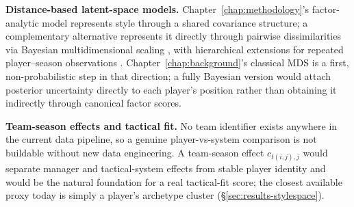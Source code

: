 \textbf{Distance-based latent-space models.} Chapter~\ref{chap:methodology}'s factor-analytic model represents
style through a shared covariance structure; a complementary alternative represents it directly through
pairwise dissimilarities via Bayesian multidimensional scaling \cite{oh2001bayesian}, with hierarchical
extensions for repeated player--season observations \cite{yanchenko2020hierarchical}. Chapter~\ref{chap:background}'s
classical MDS is a first, non-probabilistic step in that direction; a fully Bayesian version would attach
posterior uncertainty directly to each player's position rather than obtaining it indirectly through canonical
factor scores.

\textbf{Team-season effects and tactical fit.} No team identifier exists anywhere in the current data
pipeline, so a genuine player-vs-system comparison is not buildable without new data engineering. A
team-season effect $c_{t(i,j),j}$ would separate manager and tactical-system effects from stable player
identity and would be the natural foundation for a real tactical-fit score; the closest available proxy today
is simply a player's archetype cluster (\S\ref{sec:results-stylespace}).
